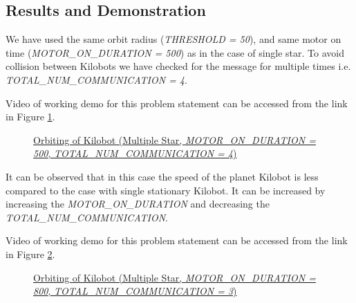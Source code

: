 \documentclass{report}[12pt]
\begin{document}
\subsection{Results and Demonstration}
We have used the same orbit radius ({\it THRESHOLD = 50}), and same motor on time ({\it MOTOR\_ON\_DURATION = 500}) as in the case of single star. To avoid collision between Kilobots we have checked for the message for multiple times i.e. {\it TOTAL\_NUM\_COMMUNICATION = 4}.

Video of working demo for this problem statement can be accessed from the link in Figure \ref{fig:planet-mstar-demo-1}.
\begin{figure}[H]
	\centering
	\caption{\href{https://drive.google.com/open?id=1LtyCuED4pWMkUGRsmc1yqm-90bjDEhDx}{Orbiting of Kilobot (Multiple Star, {\it MOTOR\_ON\_DURATION = 500}, {\it TOTAL\_NUM\_COMMUNICATION = 4})}}
	\label{fig:planet-mstar-demo-1}
\end{figure}

It can be observed that in this case the speed of the planet Kilobot is less compared to the case with single stationary Kilobot. It can be increased by increasing the {\it MOTOR\_ON\_DURATION} and decreasing the {\it TOTAL\_NUM\_COMMUNICATION}.

Video of working demo for this problem statement can be accessed from the link in Figure \ref{fig:planet-mstar-demo-2}.

\begin{figure}[H]
	\centering
	\caption{\href{https://drive.google.com/open?id=1f9FGpkbiLwUOuI4cfdkbgaj63m5EHV17}{Orbiting of Kilobot (Multiple Star, {\it MOTOR\_ON\_DURATION = 800}, {\it TOTAL\_NUM\_COMMUNICATION = 3})}}
	\label{fig:planet-mstar-demo-2}
\end{figure}
\end{document}
